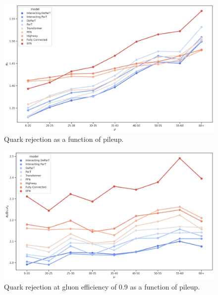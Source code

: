 \begin{figure}[htb]
    \centering
    \includegraphics[width=1\linewidth]{src/plots/results/mu_dep/quark_rejection.jpg}
    \caption{Quark rejection as a function of pileup.}
    \label{fig:quark_rej_pileup}
\end{figure}

\begin{figure}[htb]
    \centering
    \includegraphics[width=1\linewidth]{src/plots/results/mu_dep/quark_rej_at_gluon_eff_0.9.jpg}
    \caption{Quark rejection at gluon efficiency of 0.9 as a function of pileup.}
    \label{fig:quark_rej_at_gluon_eff_0.9_pileup}
\end{figure}

